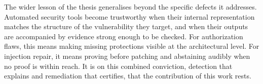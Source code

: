 The wider lesson of the thesis generalises beyond the specific defects it
addresses. Automated security tools become trustworthy when their internal
representation matches the structure of the vulnerability they target, and
when their outputs are accompanied by evidence strong enough to be checked.
For authorization flaws, this means making missing protections visible at
the architectural level. For injection repair, it means proving before
patching and abstaining audibly when no proof is within reach. It is on this
combined conviction, detection that explains and remediation that certifies,
that the contribution of this work rests.